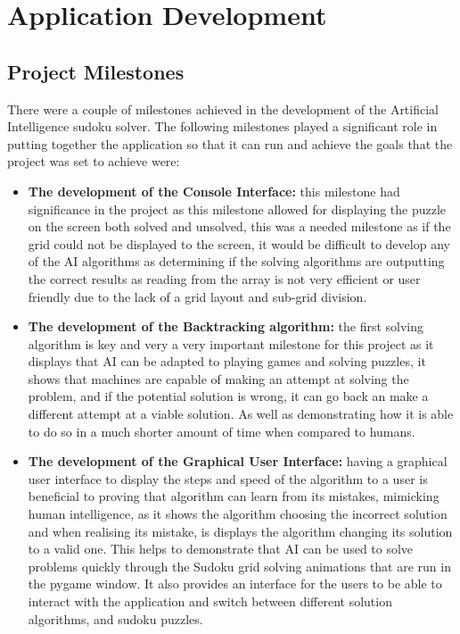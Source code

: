 \documentclass[]{final_report}
\begin{document}
\chapter{Application Development}

\section{Project Milestones}

There were a couple of milestones achieved in the development of the Artificial Intelligence sudoku solver. The following milestones played a significant role in putting together the application so that it can run and achieve the goals that the project was set to achieve were: 

\begin{itemize} 
    \item \textbf{The development of the Console Interface:} this milestone had significance in the project as this milestone allowed for displaying the puzzle on the screen both solved and unsolved, this was a needed milestone as if the grid could not be displayed to the screen, it would be difficult to develop any of the AI algorithms as determining if the solving algorithms are outputting the correct results as reading from the array is not very efficient or user friendly due to the lack of a grid layout and sub-grid division. 

    \item \textbf{The development of the Backtracking algorithm:} the first solving algorithm is key and very a very important milestone for this project as it displays that AI can be adapted to playing games and solving puzzles, it shows that machines are capable of making an attempt at solving the problem, and if the potential solution is wrong, it can go back an make a different attempt at a viable solution. As well as demonstrating how it is able to do so in a much shorter amount of time when compared to humans.  

    \item \textbf{The development of the Graphical User Interface:} having a graphical user interface to display the steps and speed of the algorithm to a user is beneficial to proving that algorithm can learn from its mistakes, mimicking human intelligence, as it shows the algorithm choosing the incorrect solution and when realising its mistake, is displays the algorithm changing its solution to a valid one. This helps to demonstrate that AI can be used to solve problems quickly through the Sudoku grid solving animations that are run in the pygame window. It also provides an interface for the users to be able to interact with the application and switch between different solution algorithms, and sudoku puzzles.


\end{itemize}
\end{document}
